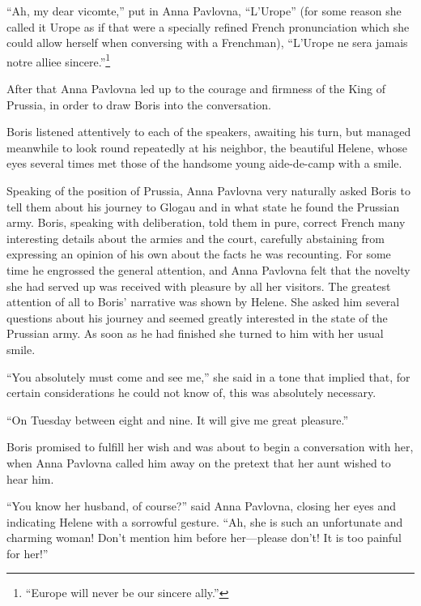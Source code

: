 ``Ah, my dear vicomte,'' put in Anna Pavlovna, ``L'Urope'' (for
some reason she called it Urope as if that were a specially
refined French pronunciation which she could allow herself when
conversing with a Frenchman), ``L'Urope ne sera jamais notre
alliee sincere.''\footnote{``Europe will never be our sincere
ally.''}

After that Anna Pavlovna led up to the courage and firmness of
the King of Prussia, in order to draw Boris into the
conversation.

Boris listened attentively to each of the speakers, awaiting his
turn, but managed meanwhile to look round repeatedly at his
neighbor, the beautiful Helene, whose eyes several times met
those of the handsome young aide-de-camp with a smile.

Speaking of the position of Prussia, Anna Pavlovna very naturally
asked Boris to tell them about his journey to Glogau and in what
state he found the Prussian army. Boris, speaking with
deliberation, told them in pure, correct French many interesting
details about the armies and the court, carefully abstaining from
expressing an opinion of his own about the facts he was
recounting. For some time he engrossed the general attention, and
Anna Pavlovna felt that the novelty she had served up was
received with pleasure by all her visitors. The greatest
attention of all to Boris' narrative was shown by Helene. She
asked him several questions about his journey and seemed greatly
interested in the state of the Prussian army. As soon as he had
finished she turned to him with her usual smile.

``You absolutely must come and see me,'' she said in a tone that
implied that, for certain considerations he could not know of,
this was absolutely necessary.

``On Tuesday between eight and nine. It will give me great
pleasure.''

Boris promised to fulfill her wish and was about to begin a
conversation with her, when Anna Pavlovna called him away on the
pretext that her aunt wished to hear him.

``You know her husband, of course?'' said Anna Pavlovna, closing
her eyes and indicating Helene with a sorrowful gesture. ``Ah,
she is such an unfortunate and charming woman! Don't mention him
before her---please don't! It is too painful for her!''


